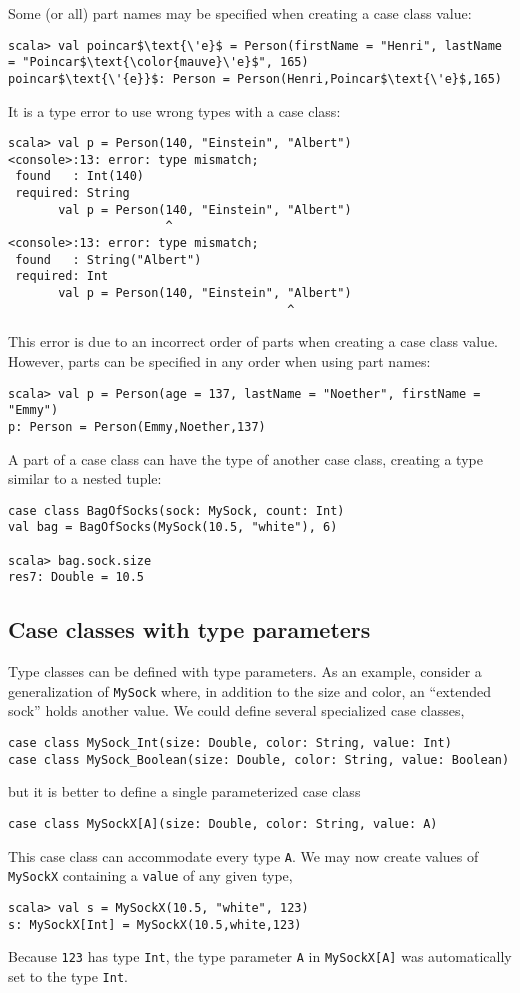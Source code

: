 Some (or all) part names may be specified when creating a case class
value:
\begin{lstlisting}[extendedchars=true,mathescape=true]
scala> val poincar$\text{\'e}$ = Person(firstName = "Henri", lastName = "Poincar$\text{\color{mauve}\'e}$", 165)
poincar$\text{\'{e}}$: Person = Person(Henri,Poincar$\text{\'e}$,165)
\end{lstlisting}
It is a type error to use wrong types with a case class:
\begin{lstlisting}
scala> val p = Person(140, "Einstein", "Albert")
<console>:13: error: type mismatch;
 found   : Int(140)
 required: String
       val p = Person(140, "Einstein", "Albert")
                      ^
<console>:13: error: type mismatch;
 found   : String("Albert")
 required: Int
       val p = Person(140, "Einstein", "Albert")
                                       ^
\end{lstlisting}
This error is due to an incorrect order of parts when creating a case
class value. However, parts can be specified in any order when using
part names:
\begin{lstlisting}
scala> val p = Person(age = 137, lastName = "Noether", firstName = "Emmy")
p: Person = Person(Emmy,Noether,137)
\end{lstlisting}
A part of a case class can have the type of another case class, creating
a type similar to a nested tuple:
\begin{lstlisting}
case class BagOfSocks(sock: MySock, count: Int)
val bag = BagOfSocks(MySock(10.5, "white"), 6)

scala> bag.sock.size
res7: Double = 10.5
\end{lstlisting}


\subsection{Case classes with type parameters}

Type classes can be defined with type parameters.
As an example, consider a generalization of \lstinline!MySock! where,
in addition to the size and color, an ``extended sock'' holds another
value. We could define several specialized case classes,
\begin{lstlisting}
case class MySock_Int(size: Double, color: String, value: Int)
case class MySock_Boolean(size: Double, color: String, value: Boolean)
\end{lstlisting}
but it is better to define a single parameterized case class
\begin{lstlisting}
case class MySockX[A](size: Double, color: String, value: A)
\end{lstlisting}
This case class can accommodate every type \lstinline!A!. We may
now create values of \lstinline!MySockX! containing a \lstinline!value!
of any given type,
\begin{lstlisting}
scala> val s = MySockX(10.5, "white", 123)
s: MySockX[Int] = MySockX(10.5,white,123) 
\end{lstlisting}
Because \lstinline!123! has type \lstinline!Int!, the type parameter
\lstinline!A! in \lstinline!MySockX[A]! was automatically set to
the type \lstinline!Int!. 

